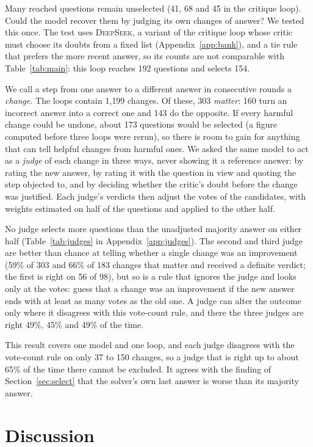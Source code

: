 \documentclass[11pt]{article}
\newcommand{\ds}{\textsc{DeepSeek}}
\begin{document}
Many reached questions remain unselected (41, 68 and 45 in the critique loop).
Could the model recover them by judging its own changes of answer?
We tested this once.
The test uses \ds, a variant of the critique loop whose critic must choose its doubts from a fixed list (Appendix~\ref{app:bank}), and a tie rule that prefers the more recent answer, so its counts are not comparable with Table~\ref{tab:main}: this loop reaches 192 questions and selects 154.

We call a step from one answer to a different answer in consecutive rounds a \emph{change}.
The loops contain 1{,}199 changes.
Of these, 303 \emph{matter}: 160 turn an incorrect answer into a correct one and 143 do the opposite.
If every harmful change could be undone, about 173 questions would be selected (a figure computed before three loops were rerun), so there is room to gain for anything that can tell helpful changes from harmful ones.
We asked the same model to act as a \emph{judge} of each change in three ways, never showing it a reference answer: by rating the new answer, by rating it with the question in view and quoting the step objected to, and by deciding whether the critic's doubt before the change was justified.
Each judge's verdicts then adjust the votes of the candidates, with weights estimated on half of the questions and applied to the other half.

No judge selects more questions than the unadjusted majority answer on either half (Table~\ref{tab:judges} in Appendix~\ref{app:judges}).
The second and third judge are better than chance at telling whether a single change was an improvement (59\% of 303 and 66\% of 183 changes that matter and received a definite verdict; the first is right on 56 of 98), but so is a rule that ignores the judge and looks only at the votes: guess that a change was an improvement if the new answer ends with at least as many votes as the old one.
A judge can alter the outcome only where it disagrees with this vote-count rule, and there the three judges are right 49\%, 45\% and 49\% of the time.

This result covers one model and one loop, and each judge disagrees with the vote-count rule on only 37 to 150 changes, so a judge that is right up to about 65\% of the time there cannot be excluded.
It agrees with the finding of Section~\ref{sec:select} that the solver's own last answer is worse than its majority answer.

\section{Discussion}
\end{document}
